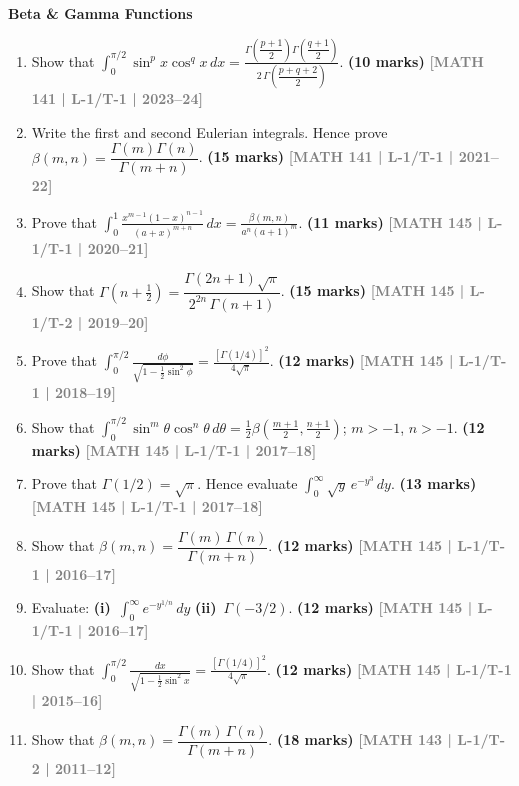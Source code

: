 \documentclass[12pt,a4paper]{article}
\newcommand{\yr}[1]{\hfill\textcolor{gray}{\small\textbf{[#1]}}}
\newcommand{\mk}[1]{\textcolor{orange!70!black}{\small\textbf{(#1 marks)}}}
\newcommand{\subtopic}[2]{%
  \vspace{10pt}
  \noindent\begin{tcolorbox}[colback=#1!8,colframe=#1,boxrule=0.6pt,arc=4pt,
    left=6pt,right=6pt,top=4pt,bottom=4pt]
    \small\bfseries\textcolor{#1}{#2}
  \end{tcolorbox}
  \vspace{2pt}
}
\begin{document}
\subtopic{cB}{Beta \& Gamma Functions}
\label{sub:s2-beta}

\begin{enumerate}\item Show that $\displaystyle\int_{0}^{\pi/2}\sin^{p}x\cos^{q}x\,dx=\frac{\Gamma\!\left(\dfrac{p+1}{2}\right)\Gamma\!\left(\dfrac{q+1}{2}\right)}{2\,\Gamma\!\left(\dfrac{p+q+2}{2}\right)}$.
\mk{10} \yr{MATH 141 | L-1/T-1 | 2023--24}

\item Write the first and second Eulerian integrals. Hence prove $\beta(m,n)=\dfrac{\Gamma(m)\Gamma(n)}{\Gamma(m+n)}$.
\mk{15} \yr{MATH 141 | L-1/T-1 | 2021--22}

\item Prove that $\displaystyle\int_{0}^{1}\frac{x^{m-1}(1-x)^{n-1}}{(a+x)^{m+n}}\,dx=\frac{\beta(m,n)}{a^{n}(a+1)^{m}}$.
\mk{11} \yr{MATH 145 | L-1/T-1 | 2020--21}

\item Show that $\Gamma\!\left(n+\tfrac{1}{2}\right)=\dfrac{\Gamma(2n+1)\sqrt{\pi}}{2^{2n}\,\Gamma(n+1)}$.
\mk{15} \yr{MATH 145 | L-1/T-2 | 2019--20}

\item Prove that $\displaystyle\int_{0}^{\pi/2}\frac{d\phi}{\sqrt{1-\tfrac{1}{2}\sin^{2}\phi}}=\frac{[\Gamma(1/4)]^{2}}{4\sqrt{\pi}}$.
\mk{12} \yr{MATH 145 | L-1/T-1 | 2018--19}

\item Show that $\displaystyle\int_{0}^{\pi/2}\sin^{m}\theta\cos^{n}\theta\,d\theta=\tfrac{1}{2}\beta\!\left(\tfrac{m+1}{2},\tfrac{n+1}{2}\right)$; $m>-1$, $n>-1$.
\mk{12} \yr{MATH 145 | L-1/T-1 | 2017--18}

\item Prove that $\Gamma(1/2)=\sqrt{\pi}$. Hence evaluate $\displaystyle\int_{0}^{\infty}\sqrt{y}\,e^{-y^{3}}\,dy$.
\mk{13} \yr{MATH 145 | L-1/T-1 | 2017--18}

\item Show that $\beta(m,n)=\dfrac{\Gamma(m)\,\Gamma(n)}{\Gamma(m+n)}$.
\mk{12} \yr{MATH 145 | L-1/T-1 | 2016--17}

\item Evaluate: \textbf{(i)}~$\displaystyle\int_{0}^{\infty}e^{-y^{1/n}}\,dy$ \quad \textbf{(ii)}~$\Gamma(-3/2)$.
\mk{12} \yr{MATH 145 | L-1/T-1 | 2016--17}

\item Show that $\displaystyle\int_{0}^{\pi/2}\frac{dx}{\sqrt{1-\tfrac{1}{2}\sin^{2}x}}=\frac{[\Gamma(1/4)]^{2}}{4\sqrt{\pi}}$.
\mk{12} \yr{MATH 145 | L-1/T-1 | 2015--16}

\item Show that $\beta(m,n)=\dfrac{\Gamma(m)\,\Gamma(n)}{\Gamma(m+n)}$.
\mk{18} \yr{MATH 143 | L-1/T-2 | 2011--12}

\end{enumerate}
\end{document}
